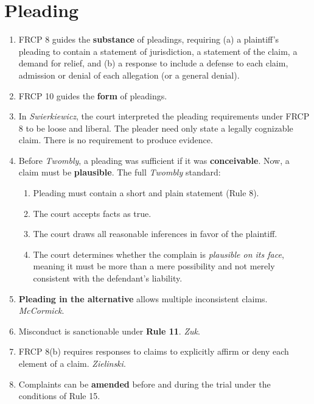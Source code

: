 \section{Pleading}

\begin{enumerate}
    \item FRCP 8 guides the \textbf{substance} of pleadings, requiring (a) a 
    plaintiff's pleading to contain a statement of jurisdiction, a statement 
    of the claim, a demand for relief, and (b) a response to include a defense 
    to each claim, admission or denial of each allegation (or a general 
    denial).
    \item FRCP 10 guides the \textbf{form} of pleadings.
    \item In \emph{Swierkiewicz}, the court interpreted the pleading 
    requirements under FRCP 8 to be loose and liberal. The pleader need only 
    state a legally cognizable claim. There is no requirement to produce 
    evidence.
    \item Before \emph{Twombly}, a pleading was sufficient if it was 
    \textbf{conceivable}. Now, a claim must be \textbf{plausible}. The full 
    \emph{Twombly} standard:
    \begin{enumerate}
        \item Pleading must contain a short and plain statement (Rule 8).
        \item The court accepts facts as true.
        \item The court draws all reasonable inferences in favor of the 
        plaintiff.
        \item The court determines whether the complain is \emph{plausible on 
        its face}, meaning it must be more than a mere possibility and not 
        merely consistent with the defendant's liability.
    \end{enumerate}
    \item \textbf{Pleading in the alternative} allows multiple inconsistent 
    claims. \emph{McCormick}.
    \item Misconduct is sanctionable under \textbf{Rule 11}. \emph{Zuk}.
    \item FRCP 8(b) requires responses to claims to explicitly affirm or deny 
    each element of a claim. \emph{Zielinski}.
    \item Complaints can be \textbf{amended} before and during the trial under 
    the conditions of Rule 15.
\end{enumerate}

